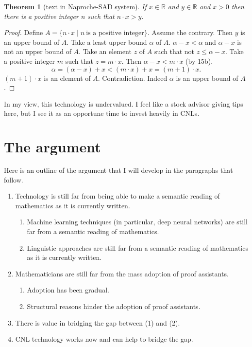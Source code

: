 \documentclass[12pt]{amsart}
\newtheorem{theorem}[definition]{Theorem}
\newcommand{\Real}{\ensuremath{{\mathbb R}}}
\newcommand{\h}[1]{\text{#1}}
\renewcommand{\~}{\ }
\renewcommand{\_}{\textunderscore}
\begin{document}
\begin{theorem}[text in Naproche-SAD system]
  If $x\in \Real$ and $y\in\Real$ and $x > 0$ then there is a positive
  integer $n$ such that $n\cdot x > y$.
\end{theorem}

\begin{proof}
  Define $A=\{n\cdot x \mid n\ \h{is a positive integer}\}$. Assume the contrary.
  Then $y$ is an upper bound of $A$.  Take a least upper bound $\alpha$ of $A$.
  $\alpha- x < \alpha$ and $\alpha - x$ is not an upper bound of $A$.
  Take an element $z$ of $A$ such that not $z \le \alpha - x$.  Take a positive
  integer $m$ such that $z = m\cdot x$. Then $\alpha - x < m\cdot x$ (by 15b).
  \[
  \alpha = (\alpha -x) + x < (m\cdot x) + x = (m+1)\cdot x.
  \]
  $(m+1)\cdot x$ is an element of $A$. Contradiction.  Indeed $\alpha$
  is an upper bound of $A$.
  \end{proof}

In my view, this technology is undervalued.  I feel like a stock
advisor giving tips here, but I see it as an opportune time to invest
heavily in CNLs.

\section{The argument}

Here is an outline of the argument that I will develop in the
paragraphs that follow.

\begin{enumerate}
\item Technology is still far from being able to make
a semantic reading of mathematics as it is currently written.
\begin{enumerate}
\item Machine learning techniques
  (in particular, deep neural networks) are still far from
a semantic reading of mathematics.
\item Linguistic approaches are still far from a semantic reading of
mathematics as it is currently written.
\end{enumerate}
\item Mathematicians are still far from the mass adoption
  of proof assistants.
  \begin{enumerate}
  \item Adoption has been gradual.
    \item Structural reasons hinder the adoption of proof assistants.
    \end{enumerate}
\item There is value in bridging the gap between (1) and (2).
\item CNL technology works now and can help to bridge the gap.
\end{enumerate}
\end{document}
